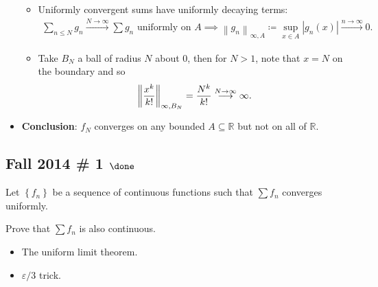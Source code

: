 \begin{solution}
\begin{itemize}
  \begin{itemize}
  \item
    Uniformly convergent sums have uniformly decaying terms:
    \begin{align*}
    \sum_{n\leq N} g_n \overset{N\to\infty}\longrightarrow\sum g_n \text{ uniformly on } A \implies {\left\lVert {g_n} \right\rVert}_{\infty, A} \coloneqq\sup_{x\in A} {\left\lvert {g_n(x)} \right\rvert} \overset{n\to\infty}\longrightarrow 0
    .\end{align*}
  \item
    Take \(B_N\) a ball of radius \(N\) about 0, then for \(N>1\), note
    that \(x=N\) on the boundary and so
    \begin{align*}
    {\left\lVert {x^k \over k!} \right\rVert}_{\infty, B_N} = {N^k \over k!} \overset{N\to\infty}\longrightarrow\infty
    .\end{align*}
  \end{itemize}
\item
  \textbf{Conclusion}: \(f_N\) converges on any bounded
  \(A\subseteq {\mathbb{R}}\) but not on all of \({\mathbb{R}}\).
\end{itemize}

\end{solution}

\hypertarget{fall-2014-1-done}{%
\subsection{\texorpdfstring{Fall 2014 \# 1
\(\done\)}{Fall 2014 \# 1 \textbackslash done}}\label{fall-2014-1-done}}

Let \(\left\{{f_n}\right\}\) be a sequence of continuous functions such
that \(\sum f_n\) converges uniformly.

Prove that \(\sum f_n\) is also continuous.

\begin{concept}

\envlist

\begin{itemize}
\tightlist
\item
  The uniform limit theorem.
\item
  \({\varepsilon}/3\) trick.
\end{itemize}

\end{concept}

